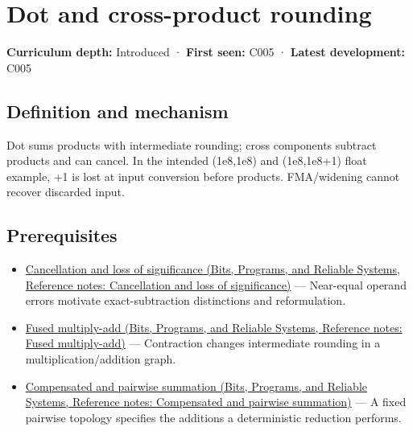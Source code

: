 \hypertarget{appendix-5aef4f13483a}{}\label{referencestart:appendix-5aef4f13483a}
\section{Dot and cross-product rounding}\label{appendix-5aef4f13483a-dot-and-cross-product-rounding}

\textbf{Curriculum depth:} Introduced · \textbf{First seen:} C005 · \textbf{Latest development:} C005

\begin{allmightroledefinition}

\subsection{Definition and mechanism}\label{appendix-5aef4f13483a-definition-and-mechanism}

Dot sums products with intermediate rounding; cross components subtract products and can cancel. In the intended (1e8,1e8) and (1e8,1e8+1) float example, +1 is lost at input conversion before products. FMA/widening cannot recover discarded input.

\end{allmightroledefinition}

\subsection{Prerequisites}\label{appendix-5aef4f13483a-prerequisites}

\begin{itemize}
\tightlist
\item
  \href{../01-Bits-Programs-and-Reliable-Systems/main.pdf\#nameddest=appendix-a2773a6a2f9d}{Cancellation and loss of significance (Bits, Programs, and Reliable Systems, Reference notes: Cancellation and loss of significance)} --- Near-equal operand errors motivate exact-subtraction distinctions and reformulation.
\item
  \href{../01-Bits-Programs-and-Reliable-Systems/main.pdf\#nameddest=appendix-41e8ef22a21e}{Fused multiply-add (Bits, Programs, and Reliable Systems, Reference notes: Fused multiply-add)} --- Contraction changes intermediate rounding in a multiplication/addition graph.
\item
  \href{../01-Bits-Programs-and-Reliable-Systems/main.pdf\#nameddest=appendix-df318da57389}{Compensated and pairwise summation (Bits, Programs, and Reliable Systems, Reference notes: Compensated and pairwise summation)} --- A fixed pairwise topology specifies the additions a deterministic reduction performs.
\end{itemize}

